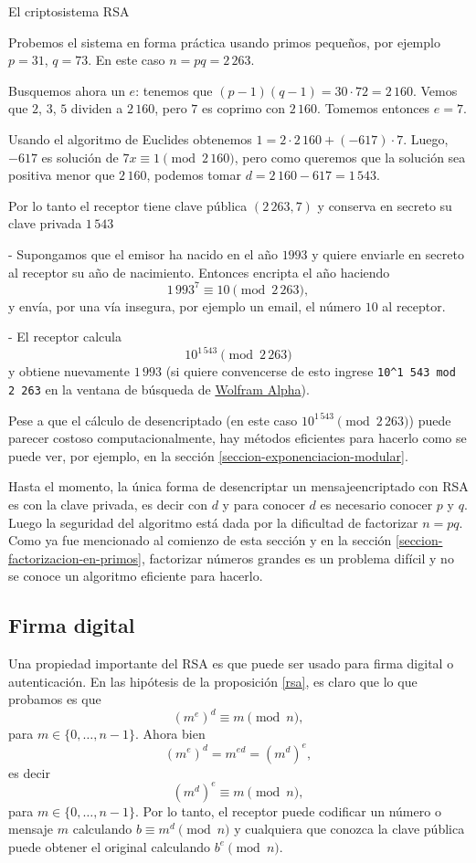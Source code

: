 \begin{section}{El criptosistema RSA}
\begin{ejemplo*} Probemos el sistema en forma práctica usando primos pequeños, por ejemplo $p=31$, $q=73$. En este caso $n = pq = 2\,263$. 

Busquemos ahora un $e$:  tenemos que $ (p-1)(q-1)= 30\cdot 72 = 2\,160$. Vemos que $2$, $3$, $5$ dividen a $2\,160$, pero $7$ es coprimo con $2\,160$. 
Tomemos entonces $e = 7$.

Usando el algoritmo de Euclides obtenemos $1 = 2\cdot 2\,160 + (-617)\cdot 7$. Luego, $-617$  es solución de $7x \equiv 1 \pmod{2\,160}$, pero como queremos que la solución sea positiva menor que $2\,160$, podemos tomar $d = 2\,160 -617 =1\,543$. 

Por lo tanto el receptor tiene clave pública $(2\,263, 7)$ y conserva en secreto  su clave privada $1\,543$

- Supongamos que el emisor ha nacido en el año $1993$ y quiere enviarle en secreto al receptor su año de nacimiento. Entonces encripta el año haciendo 
$$
1\,993^7 \equiv 10 \pmod{2\,263},
$$   
y envía, por una vía insegura, por ejemplo un email, el número $10$ al receptor.

- El receptor calcula
$$
10^{1\,543} \pmod{2\,263}
$$ 
y obtiene nuevamente $1\,993$ (si quiere convencerse de esto ingrese \texttt{10\^{}1\,543 mod 2\,263} en la ventana de búsqueda de \href{https://www.wolframalpha.com}{Wolfram Alpha}).

Pese a que el cálculo de desencriptado (en este caso $10^{1\,543} \pmod{2\,263}$) puede parecer costoso computacionalmente, hay métodos eficientes para hacerlo como se puede ver, por ejemplo, en la sección \ref{seccion-exponenciacion-modular}. 

\begin{observacion*} 
    Hasta el momento, la única forma de desencriptar un mensajeencriptado con RSA  es con la clave privada, es decir con $d$ y para conocer $d$ es necesario conocer $p$ y $q$. Luego la seguridad del algoritmo está dada por la dificultad de factorizar $n=pq$. Como ya fue mencionado al comienzo de esta sección y en la sección \ref{seccion-factorizacion-en-primos}, factorizar números grandes es un problema difícil y no se conoce un algoritmo eficiente para hacerlo. 
\end{observacion*}

\end{ejemplo*}

\subsection*{Firma digital}
Una propiedad importante del RSA es que puede ser usado para firma digital o autenticación. En las hipótesis de la proposición \ref{rsa}, es claro que lo que probamos es que 
$$
(m^e)^d \equiv m \pmod{n},
$$
para $m \in \{0,\ldots,n-1\}$. Ahora bien 
$$
(m^e)^d  = m^{ed} = (m^d)^e,  
$$
es decir
$$
(m^d)^e \equiv m \pmod{n}, 
$$
para $m \in \{0,\ldots,n-1\}$. Por lo tanto, el receptor puede codificar un número o mensaje $m$ calculando  $b \equiv m^d  \pmod{n}$ y cualquiera que conozca la clave pública puede obtener el original calculando $b^e \pmod{n}$. 


\end{section}
